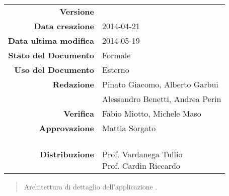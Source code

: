 


\newcommand{\Versione}{\versioneDefinizioneDiProdotto{}} %
\newcommand{\Data}{2014-04-21}				           	 %
\newcommand{\DataUltimaModifica}{2014-05-19}
\newcommand{\TipoDocumento}{Definizione di Prodotto}	 %



\begin{center}
\begin{tabular}{r|l}
\textbf{Versione} & \Versione{} \\
\textbf{Data creazione} & \Data{} \\
\textbf{Data ultima modifica} & \DataUltimaModifica{} \\
\textbf{Stato del Documento} & Formale \\		          %
\textbf{Uso del Documento} & Esterno \\			          %
\textbf{Redazione} &  Pinato Giacomo, Alberto Garbui\\	  %
& Alessandro Benetti, Andrea Perin\\
\textbf{Verifica} & Fabio Miotto, Michele Maso\\  %
\textbf{Approvazione} & Mattia Sorgato\\				      %
\textbf{Distribuzione} & \parbox[t]{4cm}{\NomeGruppo{}\\Prof. Vardanega Tullio\\Prof. Cardin Riccardo\\ \Prop{} }\\
\end{tabular}
\end{center}

\vspace{0.05in}

\begin{abstract}
\begin{center}
Architettura di dettaglio dell'applicazione \Progetto{}.
\end{center}
\end{abstract}

